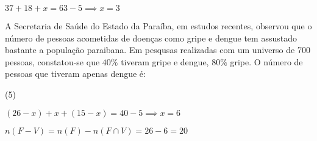 \documentclass[a4paper,11pt,addpoints]{exam}
\begin{document}
\begin{questions}
\begin{solution}[1in]
\begin{center}
  \end{center}

  $37 + 18 + x = 63 - 5 \implies \boxed{x = 3}$
\end{solution}

\question[1]

A Secretaria de Saúde do Estado da Paraíba, em estudos recentes, observou que o número de pessoas acometidas de 
doenças como gripe e dengue tem assustado bastante a população paraibana. Em pesqusas realizadas com um universo
de 700 pessoas, constatou-se que $40\%$ tiveram gripe e dengue, $80\%$ gripe. O número de pessoas que tiveram apenas dengue é:

\begin{tasks}(5)
\end{tasks}

\begin{solution}[2in]
  \begin{center}
  \end{center}


  $(26 - x) + x + (15 - x) = 40 - 5 \implies x = 6$

  $n(F - V) = n(F) - n(F \cap V) = 26 - 6 = \boxed{20}$
\end{solution}

\end{questions}
\end{document}
